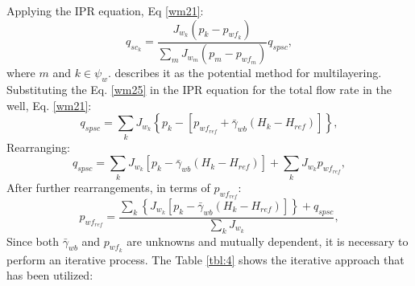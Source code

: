 Applying the IPR equation, Eq \ref{wm21}:
\begin{equation}
\label{wm27}
q_{sc_k} = \frac{J_{w_k} (p_k- p_{wf_k})}{\sum_{m}J_{w_m} (p_m- p_{wf_m})} q_{spsc},
\end{equation}
where $m$ and $k \in \psi_w$. \cite{Ertekin2001} describes it as the potential method for multilayering. Substituting the Eq. \ref{wm25} in the IPR equation for the total flow rate in the well, Eq. \ref{wm21}:
\begin{equation}
\label{wm30}
q_{spsc} = \sum_{k} J_{w_k} \left\lbrace p_k - \left[ p_{wf_{ref}} + \bar{\gamma}_{wb} \left( H_k - H_{ref} \right)  \right]  \right\rbrace,
\end{equation}
Rearranging:
\begin{equation}
\label{wm31}
q_{spsc} = \sum_{k} J_{w_k} \left[  p_k - \bar{\gamma}_{wb} \left( H_k - H_{ref} \right) \right] + \sum_{k} J_{w_k} p_{wf_{ref}},
\end{equation}
After further rearrangements, in terms of $p_{wf_{ref}}$:
\begin{equation}
\label{wm28}
p_{wf_{ref}} = \frac{\sum_{k} \left\lbrace J_{w_k} \left[ p_k - \bar{\gamma}_{wb} (H_k - H_{ref})\right] \right\rbrace + q_{spsc}}{\sum_{k}J_{w_k}},
\end{equation}
Since both $\bar{\gamma}_{wb}$ and $p_{wf_{k}}$ are unknowns and mutually dependent, it is necessary to perform an iterative process. The Table \ref{tbl:4} shows the iterative approach that has been utilized:

